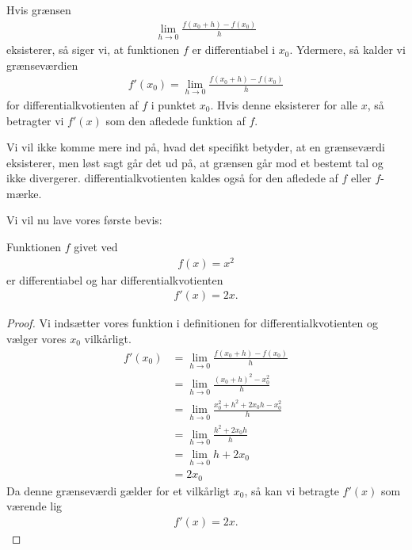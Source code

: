 \begin{defn}
Hvis grænsen 
\begin{align*}
\lim_{h\to 0} \frac{f(x_0+h)-f(x_0)}{h}
\end{align*}
eksisterer, så siger vi, at funktionen $f$ er differentiabel i $x_0$. Ydermere, så kalder vi grænseværdien 
\begin{align*}
f'(x_0) = \lim_{h\to 0} \frac{f(x_0+h)-f(x_0)}{h}
\end{align*}
for differentialkvotienten af $f$ i punktet $x_0$. Hvis denne eksisterer for alle $x$, så betragter vi $f'(x)$ som den afledede funktion af $f$. 
\end{defn}
Vi vil ikke komme mere ind på, hvad det specifikt betyder, at en grænseværdi eksisterer, men løst sagt går det ud på, at grænsen går mod et bestemt tal og ikke divergerer. 
differentialkvotienten kaldes også for den afledede af $f$ eller $f$-mærke. 

Vi vil nu lave vores første bevis:
\begin{setn}
	Funktionen $f$ givet ved
	\begin{align*}
		f(x) = x^2
	\end{align*}
	er differentiabel og har differentialkvotienten
	\begin{align*}
		f'(x) = 2x.
	\end{align*}
\end{setn}
\begin{proof}
	Vi indsætter vores funktion i definitionen for differentialkvotienten og vælger vores $x_0$ vilkårligt.
	\begin{align*}
		f'(x_0) &= \lim_{h\to 0}\frac{f(x_0 + h)-f(x_0)}{h}\\
		&=\lim_{h\to 0} \frac{(x_0+h)^2-x_0^2}{h}\\
		&=\lim_{h\to 0}\frac{x_0^2+h^2+2x_0h - x_0^2}{h}\\
		&=\lim_{h\to 0}\frac{h^2 + 2x_0h}{h}\\
		&= \lim_{h\to 0}h + 2x_0\\
		&=2x_0
	\end{align*}
	Da denne grænseværdi gælder for et vilkårligt $x_0$, så kan vi betragte $f'(x)$ som værende lig
	\begin{align*}
		f'(x) = 2x.
	\end{align*}
\end{proof}
